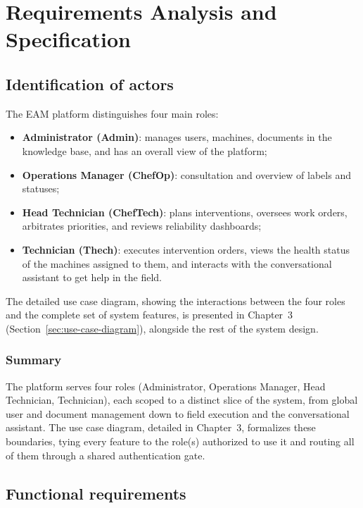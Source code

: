 \chapter{Requirements Analysis and Specification}

\section{Identification of actors}

The EAM platform distinguishes four main roles:
\begin{itemize}
\item \textbf{Administrator (Admin)}: manages users, machines, documents in the knowledge base, and has an overall view of the platform;
\item \textbf{Operations Manager (ChefOp)}: consultation and overview of labels and statuses;
\item \textbf{Head Technician (ChefTech)}: plans interventions, oversees work orders, arbitrates priorities, and reviews reliability dashboards;
\item \textbf{Technician (Thech)}: executes intervention orders, views the health status of the machines assigned to them, and interacts with the conversational assistant to get help in the field.
\end{itemize}

\noindent
The detailed use case diagram, showing the interactions between the four roles and the complete set of system features, is presented in Chapter~3 (Section~\ref{sec:use-case-diagram}), alongside the rest of the system design.

\subsection{Summary}

The platform serves four roles (Administrator, Operations Manager, Head Technician, Technician), each scoped to a distinct slice of the system, from global user and document management down to field execution and the conversational assistant. The use case diagram, detailed in Chapter~3, formalizes these boundaries, tying every feature to the role(s) authorized to use it and routing all of them through a shared authentication gate.

\section{Functional requirements}

